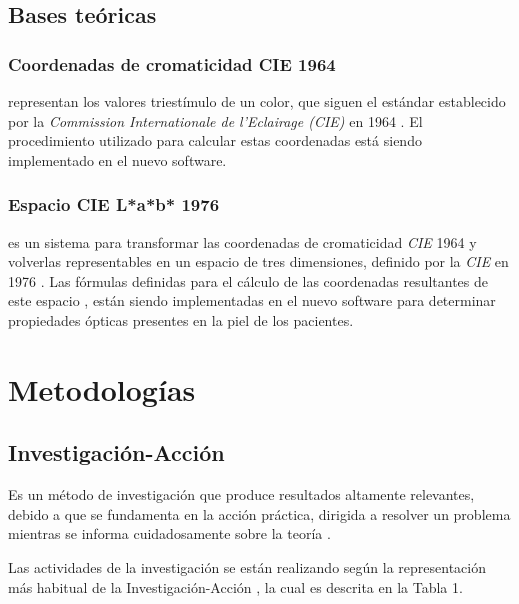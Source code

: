 \documentclass[conference]{IEEEtran}
\begin{document}
	\subsection{Bases te\'{o}ricas}
		\subsubsection{Coordenadas de cromaticidad CIE 1964}
		representan los valores triest\'{i}mulo de un color, que siguen el est\'{a}ndar establecido por la \textit{Commission Internationale de l'Eclairage (CIE)} en 1964 \cite{CIE}. El procedimiento utilizado para calcular estas coordenadas \cite{Schanda} est\'{a} siendo implementado en el nuevo software.

		\subsubsection{Espacio CIE L*a*b* 1976}
		es un sistema para transformar las coordenadas de cromaticidad \textit{CIE} 1964 y volverlas representables en un espacio de tres dimensiones, definido por la \textit{CIE} en 1976 \cite{CIE}. Las f\'{o}rmulas definidas para el c\'{a}lculo de las coordenadas resultantes de este espacio \cite{Schanda}, est\'{a}n siendo implementadas en el nuevo software para determinar propiedades \'{o}pticas presentes en la piel de los pacientes.

\section{Metodolog\'{i}as}

	\subsection{Investigaci\'{o}n-Acci\'{o}n}
		Es un m\'{e}todo de investigaci\'{o}n que produce resultados altamente relevantes, debido a que se fundamenta en la acci\'{o}n pr\'{a}ctica, dirigida a resolver un problema mientras se informa cuidadosamente sobre la teor\'{i}a \cite{Baskerville}.
		
		Las actividades de la investigaci\'{o}n se est\'{a}n realizando seg\'{u}n la representaci\'{o}n m\'{a}s habitual de la Investigaci\'{o}n-Acci\'{o}n \cite{Baskerville}, la cual es descrita en la Tabla 1.
		
\end{document}
